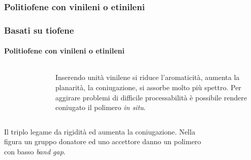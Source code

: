 \subsubsection{Politiofene con vinileni o etinileni}\begin{frame}\frametitle{Basati su tiofene}\framesubtitle{Politiofene con vinileni o etinileni}
\begin{columns}
\vspace{-10pt}
\begin{figure}{}\end{figure}
Inserendo unità vinilene si riduce l'aromaticità, aumenta la planarità, la coniugazione, si assorbe molto più spettro. Per aggirare problemi di difficile processabilità è possibile rendere coniugato il polimero \emph{in situ}. 
\end{columns}
\begin{columns}
Il triplo legame da rigidità ed aumenta la coniugazione. Nella figura un gruppo donatore ed uno accettore danno un polimero con basso \emph{band gap}.
\begin{figure}{}\end{figure}
\end{columns}
\end{frame}
